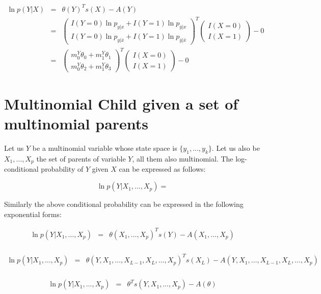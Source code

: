 \documentclass[11pt, oneside]{article}   	%
\numberwithin{figure}{section}
\numberwithin{equation}{section}
\numberwithin{table}{section}
\begin{document}
\begin{eqnarray*}
\ln p(Y|X) &=& \theta(Y)^T s(X) - A(Y) \\
&=&
\begin{pmatrix}
I(Y=0)\ln p_{y|x}  + I(Y=1)\ln p_{\bar{y}|x}\\
I(Y=0)\ln p_{y|\bar{x}}  + I(Y=1)\ln p_{\bar{y}|\bar{x}}
\end{pmatrix}^T
\begin{pmatrix}
I(X=0) \\
I(X=1)
\end{pmatrix}
- 0\\
&=&
\begin{pmatrix}
m^Y_0\theta_0  +  m^Y_1\theta_1\\
m^Y_0\theta_2  + m^Y_1\theta_3
\end{pmatrix}^T
\begin{pmatrix}
I(X=0) \\
I(X=1)
\end{pmatrix}
- 0
\end{eqnarray*}



\section{Multinomial Child given a set of multinomial parents}

Let us $Y$ be a multinomial variable whose state space is $\{y_1,...,y_k\}$. Let us also be $X_1,\ldots,X_p$ the set of parents of variable $Y$, all them also multinomial. The log-conditional probability of $Y$ given $X$ can be expressed as follows:

$$ \ln p(Y|X_1,\ldots,X_p) = $$


Similarly the above conditional probability can be expressed in the following exponential forms:

\begin{eqnarray*}
\ln p(Y|X_1,\ldots ,X_p) &=& \theta(X_1,\ldots ,X_p)^Ts(Y) - A(X_1,\ldots ,X_p) \\
\end{eqnarray*}

\begin{eqnarray*}
\ln p(Y|X_1,\ldots ,X_p) &=& \theta(Y, X_1,\ldots ,X_{L-1},X_L, \ldots ,X_p)^T s(X_L) - A(Y, X_1,\ldots ,X_{L-1},X_L, \ldots ,X_p) \\
\end{eqnarray*}


\begin{eqnarray*}
\ln p(Y|X_1,\ldots ,X_p) &=& \theta^Ts(Y,X_1,\ldots ,X_p) - A(\theta) \\
\end{eqnarray*}
\end{document}
